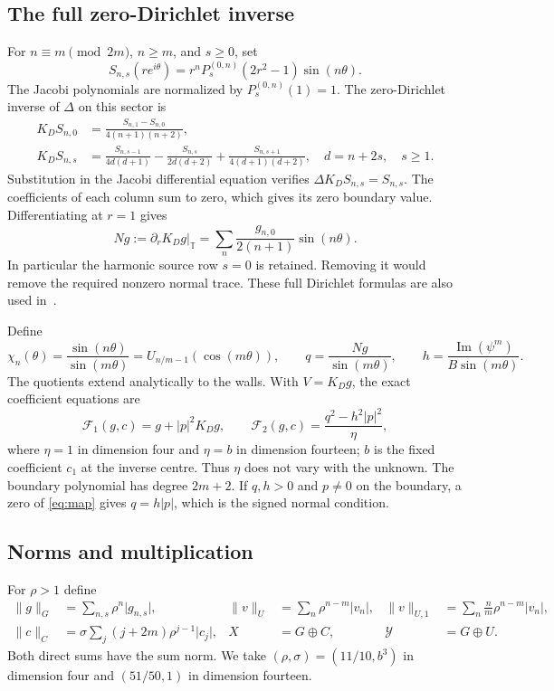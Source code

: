 \documentclass[11pt]{amsart}
\theoremstyle{remark}
\numberwithin{equation}{section}
\newcommand{\T}{\mathbb T}
\newcommand{\F}{\mathcal F}
\newcommand{\im}{\operatorname{Im}}
\newcommand{\norm}[1]{\lVert#1\rVert}
\newcommand{\abs}[1]{\lvert#1\rvert}
\begin{document}
\subsection{The full zero-Dirichlet inverse}
For $n\equiv m\pmod{2m}$, $n\ge m$, and $s\ge0$, set
\[
 S_{n,s}(re^{i\theta})
 =r^nP_s^{(0,n)}(2r^2-1)\sin(n\theta).
\]
The Jacobi polynomials are normalized by $P_s^{(0,n)}(1)=1$. The
zero-Dirichlet inverse of $\Delta$ on this sector is
\begin{align}
 K_DS_{n,0}&=\frac{S_{n,1}-S_{n,0}}{4(n+1)(n+2)},\label{eq:kd0}\\
 K_DS_{n,s}&=\frac{S_{n,s-1}}{4d(d+1)}
             -\frac{S_{n,s}}{2d(d+2)}
             +\frac{S_{n,s+1}}{4(d+1)(d+2)},\quad
 d=n+2s,\quad s\ge1.\label{eq:kds}
\end{align}
Substitution in the Jacobi differential equation verifies
$\Delta K_DS_{n,s}=S_{n,s}$. The coefficients of each column sum to zero,
which gives its zero boundary value. Differentiating at $r=1$ gives
\begin{equation}\label{eq:normal}
 Ng:=\partial_rK_Dg|_\T
   =\sum_n\frac{g_{n,0}}{2(n+1)}\sin(n\theta).
\end{equation}
In particular the harmonic source row $s=0$ is retained. Removing it
would remove the required nonzero normal trace. These full Dirichlet
formulas are also used in~\cite{CSS2026}.

Define
\[
 \chi_n(\theta)=\frac{\sin(n\theta)}{\sin(m\theta)}
 =U_{n/m-1}(\cos(m\theta)),\qquad
 q=\frac{Ng}{\sin(m\theta)},\qquad
 h=\frac{\im(\psi^m)}{B\sin(m\theta)}.
\]
The quotients extend analytically to the walls. With $V=K_Dg$, the exact
coefficient equations are
\begin{equation}\label{eq:map}
 \F_1(g,c)=g+\abs p^2K_Dg,\qquad
 \F_2(g,c)=\frac{q^2-h^2\abs p^2}{\eta},
\end{equation}
where $\eta=1$ in dimension four and $\eta=b$ in dimension fourteen;
$b$ is the fixed coefficient $c_1$ at the inverse centre. Thus $\eta$
does not vary with the unknown. The boundary polynomial has degree
$2m+2$. If $q,h>0$ and $p\ne0$ on the boundary, a zero of
\eqref{eq:map} gives $q=h\abs p$, which is the signed normal condition.

\subsection{Norms and multiplication}
For $\rho>1$ define
\begin{align}
 \norm g_G&=\sum_{n,s}\rho^n\abs{g_{n,s}},&
 \norm v_U&=\sum_n\rho^{n-m}\abs{v_n},&
 \norm v_{U,1}&=\sum_n\frac nm\rho^{n-m}\abs{v_n},\label{eq:norms}\\
 \norm c_C&=\sigma\sum_j(j+2m)\rho^{j-1}\abs{c_j},&
 X&=G\oplus C,&
 \mathcal Y&=G\oplus U.\label{eq:shapenorm}
\end{align}
Both direct sums have the sum norm. We take
$(\rho,\sigma)=(11/10,b^3)$ in dimension four and
$(51/50,1)$ in dimension fourteen.
\end{document}
